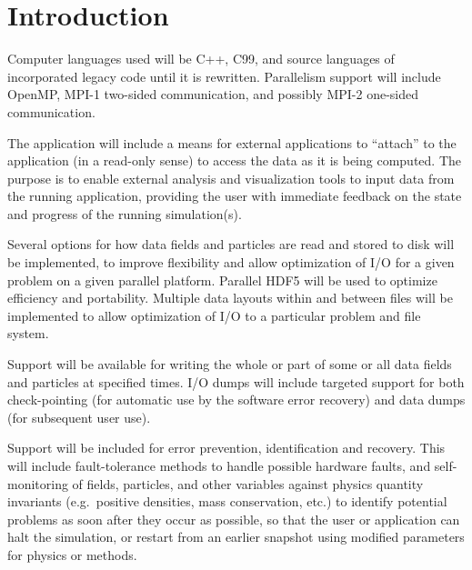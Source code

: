 \chapter{Introduction} \label{s:intro}

Computer languages used will be C++, C99, and source languages of
incorporated legacy code until it is rewritten.  Parallelism support
will include OpenMP, MPI-1 two-sided communication, and possibly MPI-2
one-sided communication.

   
   The application will include a means for external applications to
   ``attach'' to the application (in a read-only sense) to access
   the data as it is being computed.  The purpose is to enable 
   external analysis and visualization tools to input data from the
   running application, providing the user with immediate
   feedback on the state and progress of the running simulation(s).


   Several options for how data fields and particles are read and
   stored to disk will be implemented, to improve flexibility and
   allow optimization of I/O for a given problem on a given parallel
   platform.  Parallel HDF5 will be used to optimize efficiency and
   portability.  Multiple data layouts within and between files will
   be implemented to allow optimization of I/O to a particular problem
   and file system.


   Support will be available for writing the whole or part of some or
   all data fields and particles at specified times.  I/O dumps will
   include targeted support for both check-pointing (for automatic use
   by the software error recovery) and data dumps (for subsequent user
   use).  
   

   Support will be included for error prevention, identification and
   recovery.  This will include fault-tolerance methods to handle
   possible hardware faults, and self-monitoring of fields, particles,
   and other variables against physics quantity invariants
   (e.g.~positive densities, mass conservation, etc.) to identify
   potential problems as soon after they occur as possible, so that
   the user or application can halt the simulation, or restart from
   an earlier snapshot using modified parameters for physics or
   methods.

